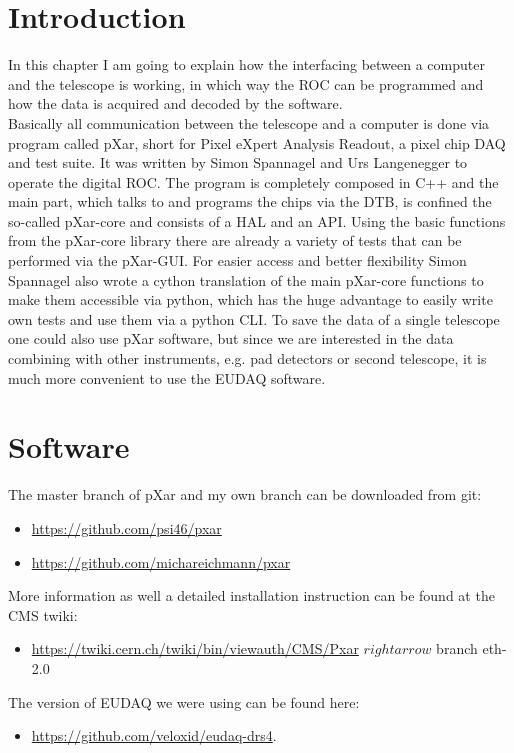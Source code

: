 
\section{Introduction}
In this chapter I am going to explain how the interfacing between a computer and the telescope is working, in which way the \ac{ROC} can be programmed and how the data is acquired and decoded by the software.\\
Basically all communication between the telescope and a computer is done via program called pXar, short for Pixel eXpert Analysis Readout, a pixel chip \ac{DAQ} and test suite. It was written by Simon Spannagel and Urs Langenegger to operate the digital \ac{ROC}. The program is completely composed in C++ and the main part, which talks to and programs the chips via the \ac{DTB}, is confined the so-called pXar-core and consists of a \ac{HAL} and an \ac{API}. Using the basic functions from the pXar-core library there are already a variety of tests that can be performed via the pXar-\ac{GUI}. For easier access and better flexibility Simon Spannagel also wrote a cython translation of the main pXar-core functions to make them accessible via python, which has the huge advantage to easily write own tests and use them via a python \ac{CLI}. To save the data of a single telescope one could also use pXar software, but since we are interested in the data combining with other instruments, e.g. pad detectors or second telescope, it is much more convenient to use the EUDAQ software.
\section{Software}
The master branch of pXar and my own branch can be downloaded from git: 
\begin{itemize}
	\item \url{https://github.com/psi46/pxar}
	\item \url{https://github.com/michareichmann/pxar}
\end{itemize}
More information as well a detailed installation instruction can be found at the \ac{CMS} twiki: 
\begin{itemize}
	\item \url{https://twiki.cern.ch/twiki/bin/viewauth/CMS/Pxar} $rightarrow$ branch eth-2.0
\end{itemize}
The version of EUDAQ we were using can be found here: 
\begin{itemize}
	\item \url{https://github.com/veloxid/eudaq-drs4}. 
\end{itemize}
